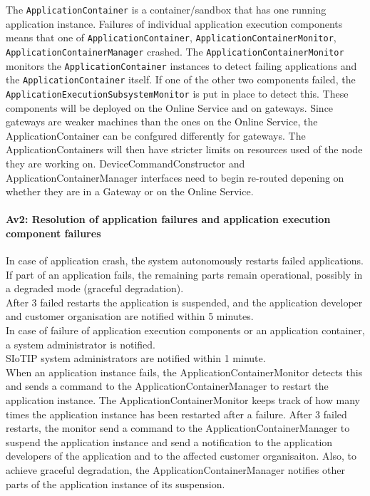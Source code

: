             The \texttt{ApplicationContainer} is a container/sandbox that has one running application instance.
            Failures of individual application execution components means that one of \texttt{ApplicationContainer}, \texttt{ApplicationContainerMonitor}, \texttt{ApplicationContainerManager} crashed.
            The \texttt{ApplicationContainerMonitor} monitors the \texttt{ApplicationContainer} instances
            to detect failing applications and the \texttt{ApplicationContainer} itself.
            If one of the other two components failed, the \texttt{ApplicationExecutionSubsystemMonitor} is put in place to detect this.
            These components will be deployed on the Online Service and on gateways.
            Since gateways are weaker machines than the ones on the Online Service,
            the ApplicationContainer can be confgured differently for gateways.
            The ApplicationContainers will then have stricter limits on
            resources used of the node they are working on.
            DeviceCommandConstructor and ApplicationContainerManager interfaces need to begin
            re-routed depening on whether they are in a Gateway or on the Online Service.
        
        \paragraph{Av2: Resolution of application failures and application execution component failures}
            In case of application crash, the system autonomously restarts failed applications.
            If part of an application fails, the remaining parts remain operational,
            possibly in a degraded mode (graceful degradation). \\
            After 3 failed restarts the application is suspended, and the
            application developer and customer organisation are notified within 5 minutes.\\

            In case of failure of application execution components or an application
            container, a system administrator is notified. \\
            SIoTIP system administrators are notified within 1 minute.\\

            When an application instance fails, the ApplicationContainerMonitor detects this and
            sends a command to the ApplicationContainerManager to restart the application instance.
            The ApplicationContainerMonitor keeps track of how many times the
            application instance has been restarted after a failure. After 3 failed restarts, the monitor
            send a command to the ApplicationContainerManager to suspend the application instance and send
            a notification to the application developers of the application and to the
            affected customer organisaiton. Also, to achieve graceful degradation,
            the ApplicationContainerManager notifies other parts of the application instance
            of its suspension.

